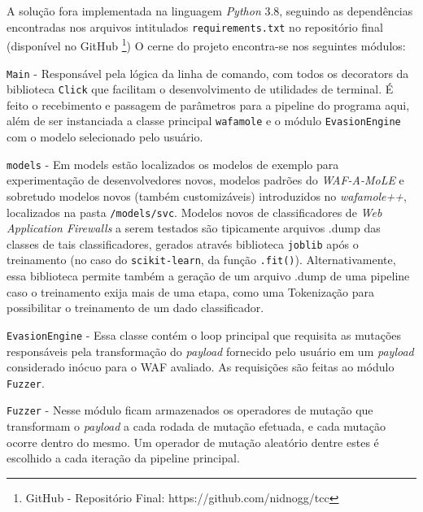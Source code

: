 A solução fora implementada na linguagem \textit{Python} 3.8, seguindo as dependências encontradas nos arquivos intitulados \verb+requirements.txt+ no repositório final (disponível no GitHub \footnote{GitHub - Repositório Final: https://github.com/nidnogg/tcc})
O cerne do projeto encontra-se nos seguintes módulos:
\begin{alineas}
\item \verb+Main+ - Responsável pela lógica da linha de comando, com todos os decorators da biblioteca \verb+Click+ que facilitam o desenvolvimento de utilidades de terminal. É feito o recebimento e passagem de parâmetros para a pipeline do programa aqui, além de ser instanciada a classe principal \verb+wafamole+ e o módulo \verb+EvasionEngine+ com o modelo selecionado pelo usuário.
\item \verb+models+ - Em models estão localizados os modelos de exemplo para experimentação de desenvolvedores novos, modelos padrões do \textit{WAF-A-MoLE} e sobretudo modelos novos (também customizáveis) introduzidos no \textit{wafamole++}, localizados na pasta \verb+/models/svc+. Modelos novos de classificadores de \textit{Web Application Firewalls} a serem testados são tipicamente arquivos .dump das classes de tais classificadores, gerados através biblioteca \verb+joblib+ após o treinamento (no caso do \verb+scikit-learn+, da função \verb+.fit()+). Alternativamente, essa biblioteca permite também a geração de um arquivo .dump de uma pipeline caso o treinamento exija mais de uma etapa, como uma Tokenização para possibilitar o treinamento de um dado classificador.
\item \verb+EvasionEngine+ - Essa classe contém o loop principal que requisita as mutações responsáveis pela transformação do \textit{payload} fornecido pelo usuário em um \textit{payload} considerado inócuo para o WAF avaliado. As requisições são feitas ao módulo \verb+Fuzzer+.
\item \verb+Fuzzer+ - Nesse módulo ficam armazenados os operadores de mutação que transformam o \textit{payload} a cada rodada de mutação efetuada, e cada mutação ocorre dentro do mesmo. Um operador de mutação aleatório dentre estes é escolhido a cada iteração da pipeline principal.
\end{alineas}

